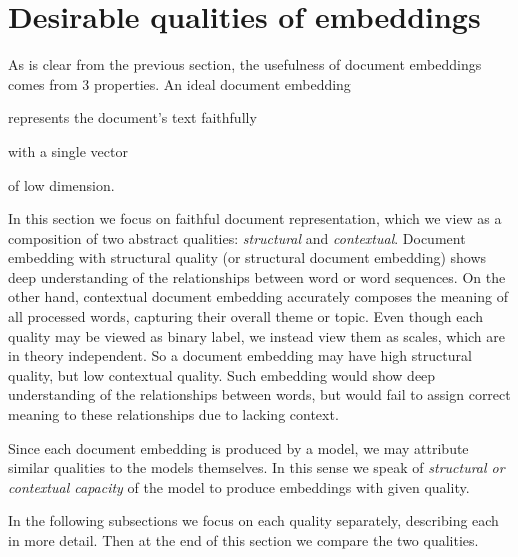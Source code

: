 \section{Desirable qualities of embeddings}





As is clear from the previous section, the usefulness of document embeddings
comes from 3 properties. An ideal document embedding
\begin{enumerate*}[label=(\arabic*)]
  \item represents the document's text faithfully
  \item with a single vector
  \item of low dimension.
\end{enumerate*}

In this section we focus on faithful document representation, which we view as
a composition of two abstract qualities: \emph{structural} and
\emph{contextual}. Document embedding with structural quality (or structural
document embedding) shows deep understanding of the relationships between word
or word sequences. On the other hand, contextual document embedding accurately
composes the meaning of all processed words, capturing their overall theme or
topic. Even though each quality may be viewed as binary label, we instead view
them as scales, which are in theory independent. So a document embedding may
have high structural quality, but low contextual quality. Such embedding would
show deep understanding of the relationships between words, but would fail to
assign correct meaning to these relationships due to lacking context.

Since each document embedding is produced by a model, we may attribute similar
qualities to the models themselves. In this sense we speak of \emph{structural
or contextual capacity} of the model to produce embeddings with given quality.

In the following subsections we focus on each quality separately, describing
each in more detail. Then at the end of this section we compare the two
qualities.

